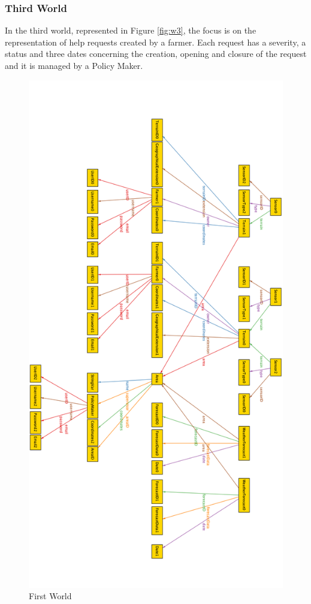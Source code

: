 \documentclass[10pt]{article}
\begin{document}
\subsubsection{Third World}
In the third world, represented in Figure \ref{fig:w3}, the focus is on the representation of help requests created by a farmer.
Each request has a severity, a status and three dates concerning the creation, opening and closure of the request and it is managed by a Policy Maker.
\begin{figure}[]
    \centering
    \includegraphics[scale=0.30]{images/worlds/world1.png}
    \caption{First World}
    \label{fig:w1}
\end{figure}
\end{document}
